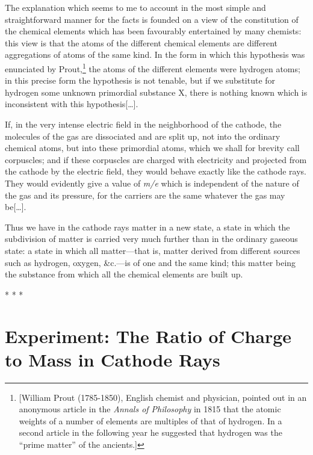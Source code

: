 The explanation which seems to me to account in the most simple and
straight\-for\-ward manner for the facts is founded on a view of the
constitution of the chemical elements which has been favourably
entertained by many chemists: this view is that the atoms of the
different chemical elements are different aggregations of atoms of the
same kind. In the form in which this hypothesis was enunciated by
Prout,\footnote{{[}William Prout (1785-1850), English chemist and
  physician, pointed out in an anonymous article in the \emph{Annals of
  Philosophy} in 1815 that the atomic weights of a number of elements
  are multiples of that of hydrogen. In a second article in the
  following year he suggested that hydrogen was the ``prime matter'' of
  the ancients.{]}} the atoms of the different elements were hydrogen
atoms; in this precise form the hypothesis is not tenable, but if we
substitute for hydrogen some unknown primordial substance X, there is
nothing known which is inconsistent with this hypothesis[\ldots].

If, in the very intense electric field in the neighborhood of the
cathode, the molecules of the gas are dissociated and are split up, not
into the ordinary chemical atoms, but into these primordial atoms, which
we shall for brevity call corpuscles; and if these corpuscles are
charged with electricity and projected from the cathode by the electric
field, they would behave exactly like the cathode rays. They would
evidently give a value of \emph{m/e} which is independent of the nature
of the gas and its pressure, for the carriers are the same whatever the
gas may be[\ldots].

Thus we have in the cathode rays matter in a new state, a state in which
the sub\-di\-vi\-sion of matter is carried very much further than in the
ordinary gaseous state: a state in which all matter---that is, matter
derived from different sources such as hydrogen, oxygen, \&c.---is of
one and the same kind; this matter being the substance from which all
the chemical elements are built up.\\
\centerline{* * *}
%
\section*{Experiment: The Ratio of Charge to Mass in Cathode Rays}

